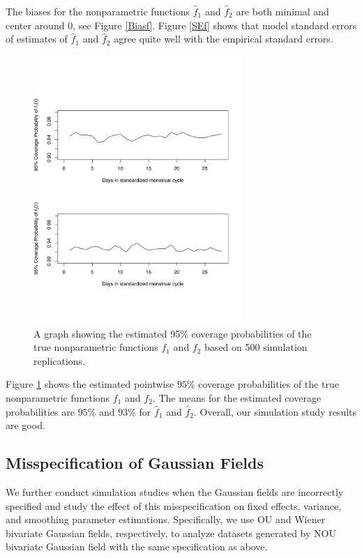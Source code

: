 \documentclass[review]{elsarticle}
\begin{document}
The biases for the nonparametric functions  $\hat f_1$ and $\hat f_2$ are both minimal and center around $0$, see Figure \ref{Biasf}. Figure \ref{SEf} shows that model standard errors of estimates of $\hat f_1$ and $\hat f_2$ agree quite well with the empirical standard errors. 

\begin{figure}[h!]
\centering
\includegraphics[width=0.7\textwidth]{bivNOU_liu_cp.pdf}
\caption{A graph showing the estimated 95\% coverage probabilities of the true nonparametric functions $f_1$ and $f_2$ based on 500 simulation replications.}
\label{cp}
\end{figure}

Figure \ref{cp} shows the estimated pointwise $95\%$ coverage probabilities of the true nonparametric functions $f_1$ and $f_2$. The means for the estimated coverage probabilities are $95\%$ and $93\%$ for  $\hat f_1$ and $\hat f_2$. Overall, our simulation study results are good.



\subsection{Misspecification of Gaussian Fields}

We further conduct simulation studies when the Gaussian fields are incorrectly specified and study the effect of this misspecification on fixed effects, variance, and smoothing parameter estimations. Specifically, we use OU and Wiener bivariate Gaussian fields, respectively, to analyze datasets generated by NOU bivariate Gaussian field with the same specification as above.
\end{document}
